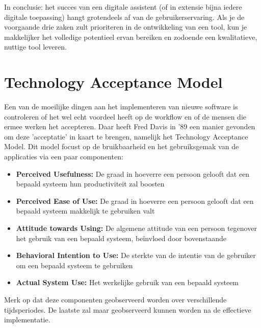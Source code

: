 In conclusie: het succes van een digitale assistent (of in extensie bijna iedere digitale toepassing) hangt grotendeels af van de gebruikerservaring.
Als je de voorgaande drie zaken zult prioriteren in de ontwikkeling van een tool, kun je makkelijker het volledige potentieel ervan bereiken en zodoende een kwalitatieve, nuttige tool leveren.

\section{Technology Acceptance Model}
Een van de moeilijke dingen aan het implementeren van nieuwe software is controleren of het wel echt voordeel heeft op de workflow en of de mensen die ermee werken het accepteren.
Daar heeft Fred Davis in '89 een manier gevonden om deze 'acceptatie' in kaart te brengen, namelijk het Technology Acceptance Model.
Dit model focust op de bruikbaarheid en het gebruiksgemak van de applicaties via een paar componenten:

\begin{itemize}
	\item \textbf{Perceived Usefulness:} De graad in hoeverre een persoon gelooft dat een bepaald systeem hun productiviteit zal boosten
	\item \textbf{Perceived Ease of Use:} De graad in hoeverre een persoon gelooft dat een bepaald systeem makkelijk te gebruiken valt
	\item \textbf{Attitude towards Using:} De algemene attitude van een persoon tegenover het gebruik van een bepaald systeem, beïnvloed door bovenstaande
	\item \textbf{Behavioral Intention to Use:} De sterkte van de intentie van de gebruiker om een bepaald systeem te gebruiken
	\item \textbf{Actual System Use:} Het werkelijke gebruik van een bepaald systeem
\end{itemize}

Merk op dat deze componenten geobserveerd worden over verschillende tijdsperiodes. De laatste zal maar geobserveerd kunnen worden na de effectieve implementatie.


